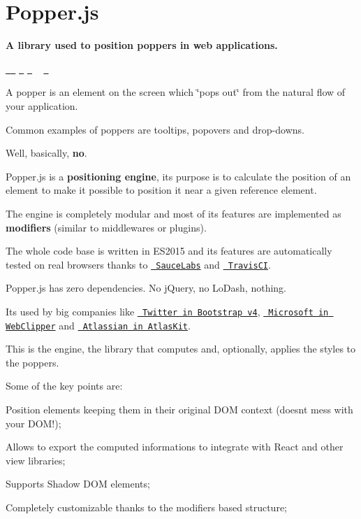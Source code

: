 \section*{Popper.\+js}

{\bfseries{A library used to position poppers in web applications.}} 

\href{https://travis-ci.org/FezVrasta/popper.js/branches}{\texttt{ }}  \href{https://www.bithound.io/github/FezVrasta/popper.js}{\texttt{ }} \href{https://codeclimate.com/github/FezVrasta/popper.js/coverage}{\texttt{ }} \href{https://gitter.im/FezVrasta/popper.js}{\texttt{ }} ~\newline
 \href{https://saucelabs.com/u/popperjs}{\texttt{ }} 



A popper is an element on the screen which \char`\"{}pops out\char`\"{} from the natural flow of your application.

Common examples of poppers are tooltips, popovers and drop-\/downs.

Well, basically, {\bfseries{no}}.

Popper.\+js is a {\bfseries{positioning engine}}, its purpose is to calculate the position of an element to make it possible to position it near a given reference element.

The engine is completely modular and most of its features are implemented as {\bfseries{modifiers}} (similar to middlewares or plugins).

The whole code base is written in E\+S2015 and its features are automatically tested on real browsers thanks to \href{https://saucelabs.com/}{\texttt{ Sauce\+Labs}} and \href{https://travis-ci.org/}{\texttt{ Travis\+CI}}.

Popper.\+js has zero dependencies. No j\+Query, no Lo\+Dash, nothing.

It\textquotesingle{}s used by big companies like \href{https://getbootstrap.com/}{\texttt{ Twitter in Bootstrap v4}}, \href{https://github.com/OneNoteDev/WebClipper}{\texttt{ Microsoft in Web\+Clipper}} and \href{https://aui-cdn.atlassian.com/atlaskit/registry/}{\texttt{ Atlassian in Atlas\+Kit}}.

This is the engine, the library that computes and, optionally, applies the styles to the poppers.

Some of the key points are\+:


\begin{DoxyItemize}
\item Position elements keeping them in their original D\+OM context (doesn\textquotesingle{}t mess with your D\+O\+M!);
\item Allows to export the computed informations to integrate with React and other view libraries;
\item Supports Shadow D\+OM elements;
\item Completely customizable thanks to the modifiers based structure;
\end{DoxyItemize}

